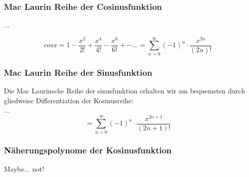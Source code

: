 \subsubsection*{Mac Laurin Reihe der Cosinusfunktion}
...
\begin{formel}
$$cos x = 1 - \frac{x^2}{2!} + \frac{x^4}{4!} - \frac{x^6}{6!} +- ... =  \sum\limits_{n=0}^{\infty}(-1)^n \cdot \frac{x^{2n}}{(2n)!}$$
\end{formel}

\subsubsection*{Mac Laurin Reihe der Sinusfunktion}
Die Mac Laurinsche Reihe der sinusfunktion erhalten wir am bequemsten durch gliedweise Differentiation der Kosinusreihe:
\\...\\
$$ = \sum\limits_{n=0}^{\infty} (-1)^n \cdot \frac{x^{2n+1}}{(2n+1)!}$$

\subsubsection*{Näherungspolynome der Kosinusfunktion}
Maybe... not!